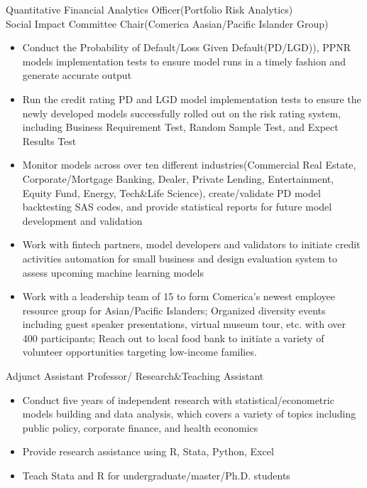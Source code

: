 \documentclass{resume}
\begin{document}
Quantitative Financial Analytics Officer(Portfolio Risk Analytics)\\
Social Impact Committee Chair(Comerica Aasian/Pacific Islander Group)
\begin{itemize}
  \item Conduct the Probability of Default/Loss Given Default(PD/LGD)), PPNR models implementation tests to ensure model runs in a timely fashion and generate accurate output
  \item Run the credit rating PD and LGD model implementation tests to ensure the newly developed models successfully rolled out on the risk rating system, including Business Requirement Test, Random Sample Test, and Expect Results Test
  \item Monitor models across over ten different industries(Commercial Real Estate, Corporate/Mortgage Banking, Dealer, Private Lending, Entertainment, Equity Fund, Energy, Tech\&Life Science), create/validate PD model backtesting SAS codes, and provide statistical reports for future model development and validation
  \item Work with fintech partners, model developers and validators to initiate credit activities automation for small business and design evaluation system to assess upcoming machine learning models
  \item Work with a leadership team of 15 to form Comerica's newest employee resource group for Asian/Pacific Islanders; Organized diversity events including guest speaker presentations, virtual museum tour, etc. with over 400 participants; Reach out to local food bank to initiate a variety of volunteer opportunities targeting low-income families.
\end{itemize}

Adjunct Assistant Professor/ Research\&Teaching Assistant
\begin{itemize}
  \item Conduct five years of independent research with statistical/econometric models building and data analysis, which covers a variety of topics including public policy, corporate finance, and health economics
  \item Provide research assistance using R, Stata, Python, Excel
  \item Teach Stata and R for undergraduate/master/Ph.D. students
\end{itemize}
\end{document}
